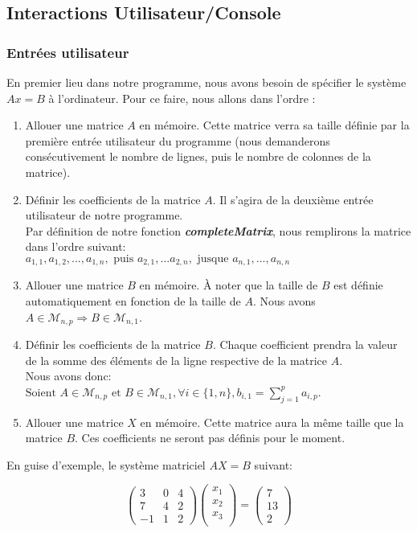 \subsection{Interactions Utilisateur/Console}
\subsubsection{Entrées utilisateur}

En premier lieu dans notre programme, nous avons besoin de spécifier le système $Ax=B$ à l'ordinateur. 
Pour ce faire, nous allons dans l'ordre :
\begin{enumerate}
\item Allouer une matrice $A$ en mémoire. Cette matrice verra sa taille définie par la première entrée utilisateur du programme (nous demanderons consécutivement le nombre de lignes, puis le nombre de colonnes de la matrice).
\item Définir les coefficients de la matrice $A$. Il s'agira de la deuxième entrée utilisateur de notre programme. \\
Par définition de notre fonction \textit{\textbf{completeMatrix}}, nous remplirons la matrice dans l'ordre suivant:\\
$a_{1,1}, a_{1,2}, ..., a_{1,n}, \text{   puis   } a_{2,1}, ... a_{2,n}, \text{   jusque   }  a_{n,1}, ..., a_{n,n}$
\item Allouer une matrice $B$ en mémoire. À noter que la taille de $B$ est définie automatiquement en fonction de la taille de $A$. Nous avons $A\in \mathcal{M}_{n,p} \Rightarrow B\in \mathcal{M}_{n,1}$.
\item Définir les coefficients de la matrice $B$. Chaque coefficient prendra la valeur de la somme des éléments de la ligne respective de la matrice $A$.\\
Nous avons donc:\\ $ \text{Soient } A\in \mathcal{M}_{n,p} \text{ et } B\in \mathcal{M}_{n,1}  , \forall i \in \{1,n\}  , b_{i,1}=\sum_{j=1}^{p} a_{i,p}$.\\
\item Allouer une matrice $X$ en mémoire. Cette matrice aura la même taille que la matrice $B$. Ces coefficients ne seront pas définis pour le moment.
\end{enumerate}
\newpage
En guise d'exemple, le système matriciel $AX=B$ suivant:

\begin{equation}
\begin{pmatrix}
3 & 0 & 4\\
7 & 4 & 2 \\
-1 & 1 & 2
\end{pmatrix} 
\begin{pmatrix}
x_1\\
x_2\\
x_3\\
\end{pmatrix}
=
\begin{pmatrix}
7 \\
13 \\
2
\end{pmatrix}
\end{equation}
\\


